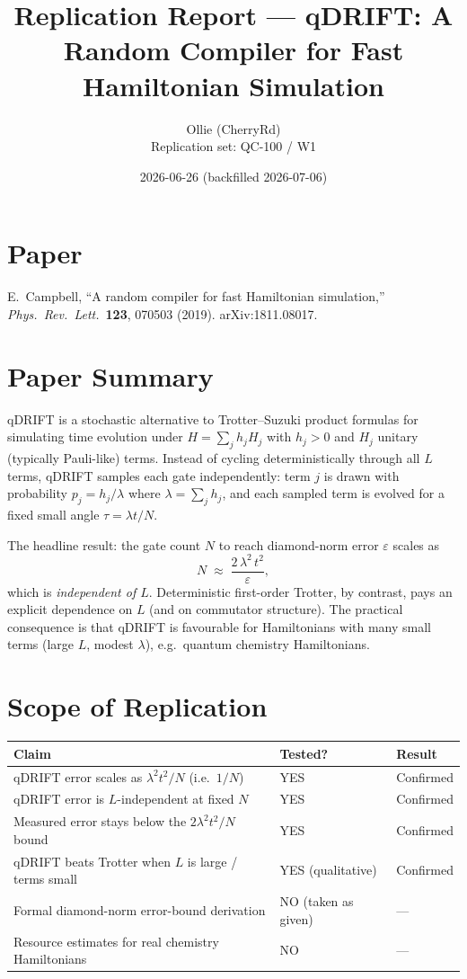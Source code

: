 \documentclass[11pt]{article}
\title{Replication Report --- qDRIFT: A Random Compiler for Fast Hamiltonian Simulation}
\author{Ollie (CherryRd) \\ Replication set: QC-100 / W1}
\date{2026-06-26 (backfilled 2026-07-06)}
\begin{document}
\maketitle

\section{Paper}
E.\ Campbell, ``A random compiler for fast Hamiltonian simulation,''
\emph{Phys.\ Rev.\ Lett.}\ \textbf{123}, 070503 (2019). arXiv:1811.08017.

\section{Paper Summary}
qDRIFT is a stochastic alternative to Trotter--Suzuki product formulas for
simulating time evolution under $H = \sum_j h_j H_j$ with $h_j > 0$ and $H_j$
unitary (typically Pauli-like) terms. Instead of cycling deterministically
through all $L$ terms, qDRIFT samples each gate independently: term $j$ is
drawn with probability $p_j = h_j / \lambda$ where $\lambda = \sum_j h_j$, and
each sampled term is evolved for a fixed small angle $\tau = \lambda t / N$.

The headline result: the gate count $N$ to reach diamond-norm error
$\varepsilon$ scales as
\[
  N \;\approx\; \frac{2\,\lambda^{2}\,t^{2}}{\varepsilon},
\]
which is \emph{independent of $L$}. Deterministic first-order Trotter, by
contrast, pays an explicit dependence on $L$ (and on commutator structure).
The practical consequence is that qDRIFT is favourable for Hamiltonians with
many small terms (large $L$, modest $\lambda$), e.g.\ quantum chemistry
Hamiltonians.

\section{Scope of Replication}
\begin{center}
\begin{tabular}{lll}
\toprule
Claim & Tested? & Result \\
\midrule
qDRIFT error scales as $\lambda^{2}t^{2}/N$ (i.e.\ $1/N$) & YES & Confirmed \\
qDRIFT error is $L$-independent at fixed $N$              & YES & Confirmed \\
Measured error stays below the $2\lambda^{2}t^{2}/N$ bound & YES & Confirmed \\
qDRIFT beats Trotter when $L$ is large / terms small     & YES (qualitative) & Confirmed \\
Formal diamond-norm error-bound derivation                & NO (taken as given) & --- \\
Resource estimates for real chemistry Hamiltonians        & NO & --- \\
\bottomrule
\end{tabular}
\end{center}
\end{document}
